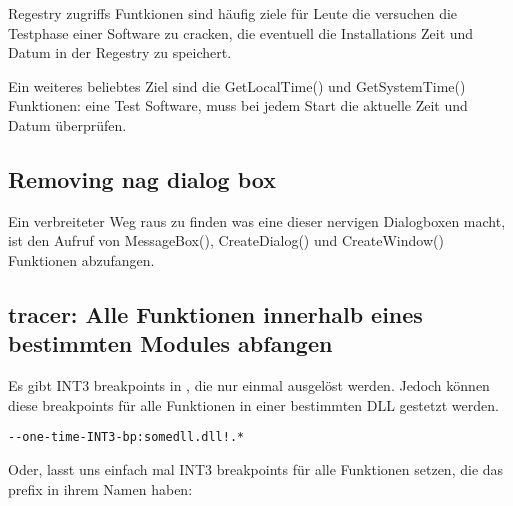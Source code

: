 Regestry zugriffs Funtkionen sind häufig ziele für Leute die versuchen die Testphase einer Software zu cracken, die 
eventuell die Installations Zeit und Datum in der Regestry zu speichert. 


Ein weiteres beliebtes Ziel sind die GetLocalTime() und GetSystemTime() Funktionen:
eine Test Software, muss bei jedem Start die aktuelle Zeit und Datum überprüfen.

\subsection{Removing nag dialog box}

Ein verbreiteter Weg raus zu finden was eine dieser nervigen Dialogboxen macht, ist den 
Aufruf von MessageBox(), CreateDialog() und CreateWindow() Funktionen abzufangen.


\subsection{tracer: Alle Funktionen innerhalb eines bestimmten Modules abfangen}

Es gibt INT3 breakpoints in \tracer, die nur einmal ausgelöst werden. Jedoch können diese breakpoints für alle 
Funktionen in einer bestimmten DLL gestetzt werden.

\begin{lstlisting}
--one-time-INT3-bp:somedll.dll!.*
\end{lstlisting}

Oder, lasst uns einfach mal INT3 breakpoints für alle Funktionen setzen, die das  prefix in ihrem Namen haben:

